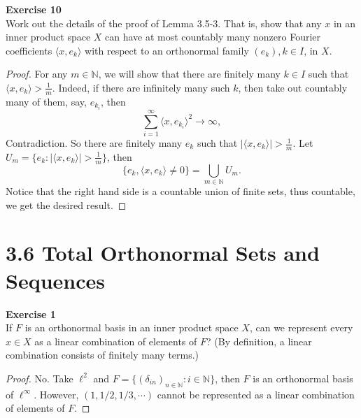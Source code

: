 \documentclass[12pt, a4paper]{article}
\theoremstyle{plain}
\newcommand{\N}{\mathbb{N}}
\newenvironment{exercise}[2][Exercise]
    { \begin{mdframed}[backgroundcolor=gray!20] \textbf{#1 #2} \\}
    {  \end{mdframed}}
\begin{document}
\pagebreak

\begin{exercise}{10}
Work out the details of the proof of Lemma 3.5-3. That is, show that any $x$ in an inner product space $X$ can have at most countably many nonzero Fourier coefficients $\langle{x,e_k}\rangle$ with respect to an orthonormal family $(e_k),k\in I$, in $X$.
\end{exercise}
	\begin{proof}
	For any $m\in \N$, we will show that there are finitely many $k\in I$ such that $\langle{x,e_k}\rangle > \frac{1}{m}$. Indeed, if there are infinitely many such $k$, then take out countably many of them, say, $e_{k_i}$, then
	\[
	\sum_{i=1}^{\infty}{\langle{x,e_{k_i}}\rangle^2}\rightarrow \infty,
	\]
	Contradiction. So there are finitely many $e_k$ such that $|\langle{x,e_k}\rangle| > \frac{1}{m}$. Let $U_m = \{e_k:|\langle{x,e_k}\rangle| > \frac{1}{m}\}$, then 
	\[
	\{e_k,\langle{x,e_k}\rangle\neq 0\} = \bigcup_{m\in \N}U_m.
	\]
	Notice that the right hand side is a countable union of finite sets, thus countable, we get the desired result.
	\end{proof}
	
\section*{3.6 Total Orthonormal Sets and Sequences}

\begin{exercise}{1}
If $F$ is an orthonormal basis in an inner product space $X$, can we represent every $x\in X$ as a linear combination of elements of $F$? (By definition, a linear combination consists of finitely many terms.)
\end{exercise}
	\begin{proof}
	No. Take $\ell^2$ and $F=\{(\delta_{in})_{n\in\N}: i\in \N\}$, then $F$ is an orthonormal basis of $\ell^\infty$. However, $(1,1/2,1/3,\cdots)$ cannot be represented as a linear combination of elements of $F$.
	\end{proof}
	
\end{document}
